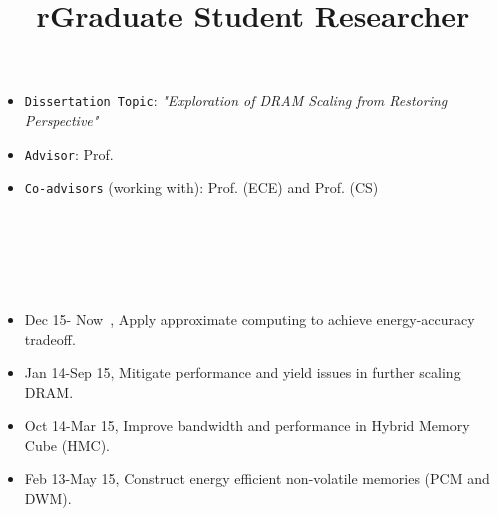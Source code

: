 \begin{resume}
 
\begin{desc}
  \begin{itemize}
  	\item {\tt Dissertation Topic}: \textit{"Exploration of DRAM Scaling from Restoring Perspective"}
	\item {\tt Advisor}:  Prof.
	\item {\tt Co-advisors} (working with): Prof. (ECE) and Prof. (CS)
  \end{itemize}
\end{desc}

 
\begin{desc}								%
\end{desc}

\section{}

\begin{formatb}
  \title{r}\\
  \\
  \body\\
\end{formatb}

	\title{Graduate Student Researcher}
					
\begin{desc}
  \vspace{-0.1in}
  \begin{itemize}
  	\item Dec 15- Now\ , Apply approximate computing to achieve energy-accuracy tradeoff.
	\item Jan 14-Sep 15, Mitigate performance and yield issues in further scaling DRAM.
	\item Oct 14-Mar 15, Improve bandwidth and performance in Hybrid Memory Cube (HMC).
	\item Feb 13-May 15, Construct energy efficient non-volatile memories (PCM and DWM).
  \end{itemize}
\end{desc}


\end{resume}
